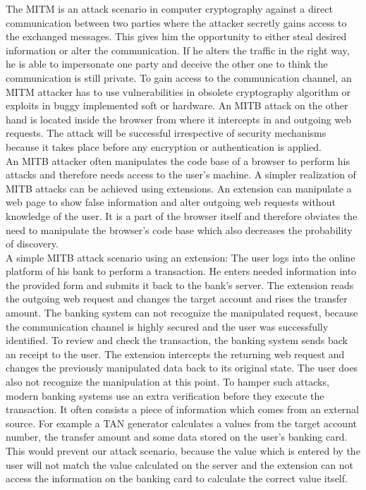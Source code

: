 \documentclass[article,colorback,accentcolor=tud9c,type=bsc]{tudthesis}
\begin{document}
	The MITM is an attack scenario in computer cryptography against a direct communication between two parties where the attacker secretly gains access to the exchanged messages. This gives him the opportunity to either steal desired information or alter the communication. If he alters the traffic in the right way, he is able to impersonate one party and deceive the other one to think the communication is still private. To gain access to the communication channel, an MITM attacker has to use vulnerabilities in obsolete cryptography algorithm or exploits in buggy implemented soft or hardware. An MITB attack on the other hand is located inside the browser from where it intercepts in and outgoing web requests. The attack will be successful irrespective of security mechanisms because it takes place before any encryption or authentication is applied. \\
	
	An MITB attacker often manipulates the code base of a browser to perform his attacks and therefore needs access to the user's machine. A simpler realization of MITB attacks can be achieved using extensions. An extension can manipulate a web page to show false information and alter outgoing web requests without knowledge of the user. It is a part of the browser itself and therefore obviates the need to manipulate the browser's code base which also decreases the probability of discovery. \\
	
	A simple MITB attack scenario using an extension: The user logs into the online platform of his bank to perform a transaction. He enters needed information into the provided form and submits it back to the bank's server. The extension reads the outgoing web request and changes the target account and rises the transfer amount. The banking system can not recognize the manipulated request, because the communication channel is highly secured and the user was successfully identified. To review and check the transaction, the banking system sends back an receipt to the user. The extension intercepts the returning web request and changes the previously manipulated data back to its original state. The user does also not recognize the manipulation at this point. To hamper such attacks, modern banking systems use an extra verification before they execute the transaction. It often consists a piece of information which comes from an external source. For example a TAN generator calculates a values from the target account number, the transfer amount and some data stored on the user's banking card. This would prevent our attack scenario, because the value which is entered by the user will not match the value calculated on the server and the extension can not access the information on the banking card to calculate the correct value itself. \\
	
\end{document}
